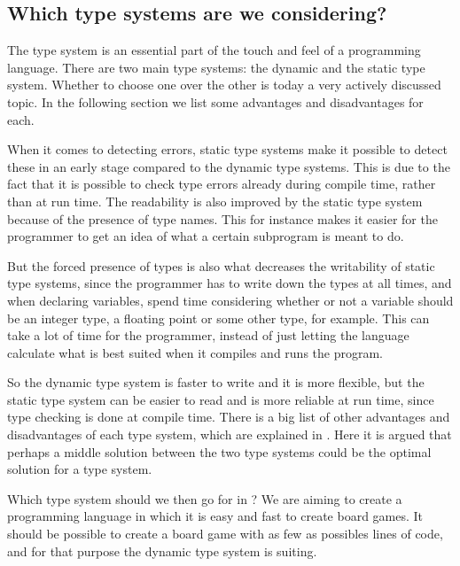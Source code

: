 \subsection{Which type systems are we considering?}
\label{sec:typesystemanalysis}

The type system is an essential part of the touch and feel of a programming
language. There are two main type systems: the dynamic and the static type
system. Whether to choose one over the other is today a very actively discussed
topic. In the following section we list some advantages and disadvantages for
each.

When it comes to detecting errors, static type systems make it possible to
detect these in an early stage compared to the dynamic type systems. This is due
to the fact that it is possible to check type errors already during compile
time, rather than at run time. The readability is also improved by the static
type system because of the presence of type names. This for instance makes it
easier for the programmer to get an idea of what a certain subprogram is meant
to do.

But the forced presence of types is also what decreases the writability of
static type systems, since the programmer has to write down the types at all
times, and when declaring variables, spend time considering whether or not a
variable should be an integer type, a floating point or some other type, for
example. This can take a lot of time for the programmer, instead of just letting
the language calculate what is best suited when it compiles and runs the
program.

So the dynamic type system is faster to write and it is more flexible, but the
static type system can be easier to read and is more reliable at run time, since
type checking is done at compile time. There is a big list of other advantages
and disadvantages of each type system, which are explained in
\cite{staticvsdynamictypesystem}. Here it is argued that perhaps a middle
solution between the two type systems could be the optimal solution for a type
system.

Which type system should we then go for in \productname{}? We are aiming to
create a programming language in which it is easy and fast to create board
games. It should be possible to create a board game with as few as possibles
lines of code, and for that purpose the dynamic type system is suiting.
